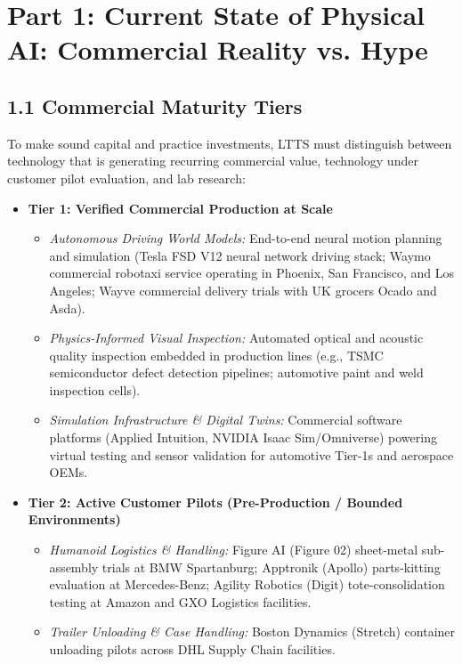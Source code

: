 \documentclass[11pt,a4paper]{article}
\begin{document}
\section{Part 1: Current State of Physical AI: Commercial Reality vs. Hype}

\subsection{1.1 Commercial Maturity Tiers}
To make sound capital and practice investments, LTTS must distinguish between technology that is generating recurring commercial value, technology under customer pilot evaluation, and lab research:

\begin{itemize}
    \item \textbf{Tier 1: Verified Commercial Production at Scale}
    \begin{itemize}
        \item \textit{Autonomous Driving World Models:} End-to-end neural motion planning and simulation (Tesla FSD V12 neural network driving stack; Waymo commercial robotaxi service operating in Phoenix, San Francisco, and Los Angeles; Wayve commercial delivery trials with UK grocers Ocado and Asda).
        \item \textit{Physics-Informed Visual Inspection:} Automated optical and acoustic quality inspection embedded in production lines (e.g., TSMC semiconductor defect detection pipelines; automotive paint and weld inspection cells).
        \item \textit{Simulation Infrastructure \& Digital Twins:} Commercial software platforms (Applied Intuition, NVIDIA Isaac Sim/Omniverse) powering virtual testing and sensor validation for automotive Tier-1s and aerospace OEMs.
    \end{itemize}

    \item \textbf{Tier 2: Active Customer Pilots (Pre-Production / Bounded Environments)}
    \begin{itemize}
        \item \textit{Humanoid Logistics \& Handling:} Figure AI (Figure 02) sheet-metal sub-assembly trials at BMW Spartanburg; Apptronik (Apollo) parts-kitting evaluation at Mercedes-Benz; Agility Robotics (Digit) tote-consolidation testing at Amazon and GXO Logistics facilities.
        \item \textit{Trailer Unloading \& Case Handling:} Boston Dynamics (Stretch) container unloading pilots across DHL Supply Chain facilities.
    \end{itemize}


\end{itemize}
\end{document}
